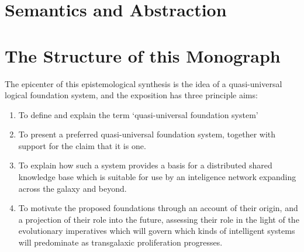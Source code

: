 \section{Semantics and Abstraction}

\section{The Structure of this Monograph}

The epicenter of this epistemological synthesis is the idea of a quasi-universal logical foundation system, and the exposition has three principle aims:
\begin{enumerate}
\item To define and explain the term `quasi-universal foundation system'
\item To present a preferred quasi-universal foundation system, together with support for the claim that it is one.
\item To explain how such a system provides a basis for a distributed shared knowledge base which is suitable for use by an inteligence network expanding across the galaxy and beyond.
\item To motivate the proposed foundations through an account of their origin, and a projection of their role into the future, assessing their role in the light of the evolutionary imperatives which will govern which kinds of intelligent systems will predominate as transgalaxic proliferation progresses.
  \end{enumerate}
  
  
  

  

